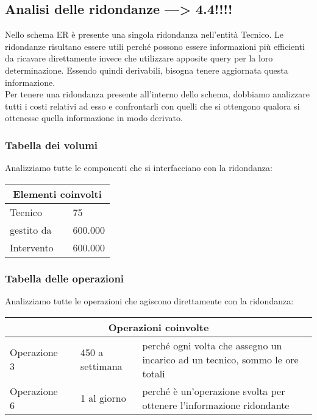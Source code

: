 \documentclass[legalpaper]{article}
\begin{document}
	\subsection{Analisi delle ridondanze ---> 4.4!!!!}
	Nello schema ER è presente una singola ridondanza nell'entità Tecnico. Le ridondanze risultano essere utili perché possono essere informazioni più efficienti da ricavare direttamente invece che utilizzare apposite query per la loro determinazione. Essendo quindi derivabili, bisogna tenere aggiornata questa informazione.\\
	Per tenere una ridondanza presente all'interno dello schema, dobbiamo analizzare tutti i costi relativi ad esso e confrontarli con quelli che si ottengono qualora si ottenesse quella informazione in modo derivato.
	
	\subsubsection{Tabella dei volumi}
	Analizziamo tutte le componenti che si interfacciano con la ridondanza: \\ \newline
	\medskip
	\renewcommand\arraystretch{1,5}
	\begin{tabular}{|p{4cm}|p{4cm}|p{4cm}|}
		\hline
		\multicolumn{3}{|c|}{\textbf{Elementi coinvolti}}\\
		\hline
		Tecnico & \centering{E} & 75\\
		\hline
		gestito da & \centering{R} & 600.000\\
		\hline
		Intervento & \centering{E} & 600.000\\
		\hline
	\end{tabular}
	
	\subsubsection{Tabella delle operazioni}	
	Analizziamo tutte le operazioni che agiscono direttamente con la ridondanza: \\ \newline
	\medskip
	\renewcommand\arraystretch{1,5}
	\begin{tabular}{|p{4cm}|p{4cm}|p{4cm}|p{4cm}|}
		\hline
		\multicolumn{4}{|c|}{\textbf{Operazioni coinvolte}}\\
		\hline
		Operazione 3 & \centering{I} & 450 a settimana & perché ogni volta che assegno un incarico ad un tecnico, sommo le ore totali\\
		\hline
		Operazione 6 & \centering{B} & 1 al giorno & perché è un'operazione svolta per ottenere l'informazione ridondante\\
		\hline
	\end{tabular}
	
			
\end{document}
